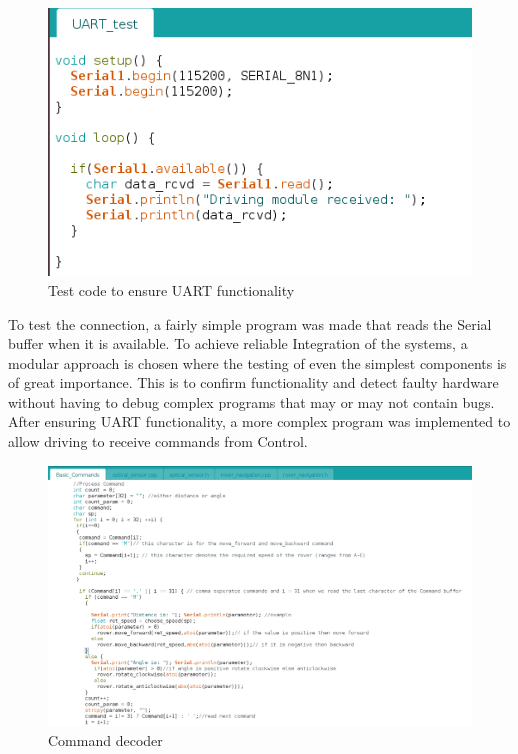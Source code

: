 \documentclass[a4paper]{article}
\begin{document}
\begin{figure}[H]
    \centering
    \includegraphics[scale=0.5]{./images/UART_test.png}
    \caption{Test code to ensure UART functionality}
    \label{image:Simple UART test}
 \end{figure}
To test the connection, a fairly simple program was made that reads the Serial buffer when it is available. To achieve reliable Integration of the systems, a modular approach is chosen where the testing of even the simplest components is of great importance.
This is to confirm functionality and detect faulty hardware without having to debug complex programs that may or may not contain bugs.
After ensuring UART functionality, a more complex program was implemented to allow driving to receive commands from Control. 
\begin{figure}[H]
    \centering
    \includegraphics[scale=0.3]{./images/Command_decoder.png}
    \caption{Command decoder}
    \label{image:CommandDecoder}
 \end{figure}
\end{document}
